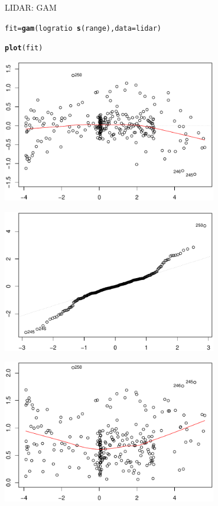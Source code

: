 \documentclass{beamer}\usepackage[]{graphicx}\usepackage[]{color}
\makeatletter
\newcommand{\hlopt}[1]{\textcolor[rgb]{0,0,0}{#1}}%
\newcommand{\hlstd}[1]{\textcolor[rgb]{0.345,0.345,0.345}{#1}}%
\newcommand{\hlkwb}[1]{\textcolor[rgb]{0.69,0.353,0.396}{#1}}%
\newcommand{\hlkwc}[1]{\textcolor[rgb]{0.333,0.667,0.333}{#1}}%
\newcommand{\hlkwd}[1]{\textcolor[rgb]{0.737,0.353,0.396}{\textbf{#1}}}%
\newenvironment{kframe}{%
 \def\at@end@of@kframe{}%
 \ifinner\ifhmode%
  \def\at@end@of@kframe{\end{minipage}}%
  \begin{minipage}{\columnwidth}%
 \fi\fi%
 \def\FrameCommand##1{\hskip\@totalleftmargin \hskip-\fboxsep
 \colorbox{shadecolor}{##1}\hskip-\fboxsep
     \hskip-\linewidth \hskip-\@totalleftmargin \hskip\columnwidth}%
 \MakeFramed {\advance\hsize-\width
   \@totalleftmargin\z@ \linewidth\hsize
   \@setminipage}}%
 {\par\unskip\endMakeFramed%
 \at@end@of@kframe}
\newenvironment{knitrout}{}{} %
\makeatother
\begin{document}
\begin{frame}[fragile]{LIDAR: GAM}

\begin{center}
\begin{scriptsize}
\begin{knitrout}
\color{fgcolor}\begin{kframe}
\begin{alltt}
\hlstd{fit}\hlkwb{=}\hlkwd{gam}\hlstd{(logratio}\hlopt{~}\hlkwd{s}\hlstd{(range),}\hlkwc{data}\hlstd{=lidar)}
\end{alltt}


{\ttfamily\noindent\bfseries{}}\begin{alltt}
\hlkwd{plot}\hlstd{(fit)}
\end{alltt}
\end{kframe}
\includegraphics[width=0.7\textwidth]{figure/020-regression-1unnamed-chunk-29-1} 

\includegraphics[width=0.7\textwidth]{figure/020-regression-1unnamed-chunk-29-2} 

\includegraphics[width=0.7\textwidth]{figure/020-regression-1unnamed-chunk-29-3} 


\end{knitrout}
\end{scriptsize}
\end{center}
\end{frame}
\end{document}
